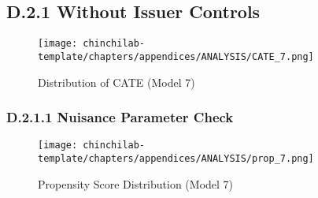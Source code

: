 \subsection{D.2.1 Without Issuer Controls}

\begin{figure}[H]
    \centering
    \texttt{[image: chinchilab-template/chapters/appendices/ANALYSIS/CATE\_7.png]}
    \caption{Distribution of CATE (Model 7)}
    \label{fig:my_label}
\end{figure}

\subsubsection{D.2.1.1 Nuisance Parameter Check}
\begin{figure}[H]
    \centering
    \texttt{[image: chinchilab-template/chapters/appendices/ANALYSIS/prop\_7.png]}
    \caption{Propensity Score Distribution (Model 7)}
    \label{fig:my_label}
\end{figure}

